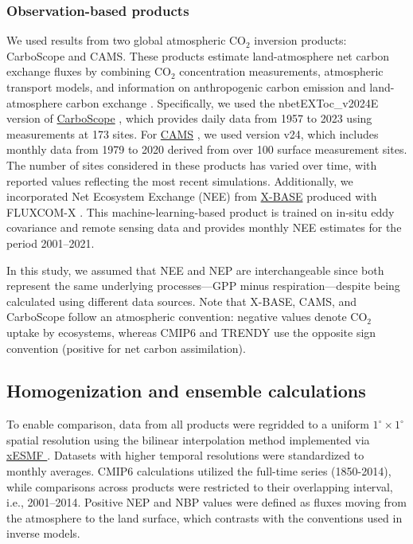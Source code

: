 \documentclass[9pt,twocolumn,twoside]{pnas-new}
\begin{document}
{%

\subsubsection*{Observation-based products}
We used results from two global atmospheric CO$_2$ inversion products: CarboScope and CAMS. These products estimate land-atmosphere net carbon exchange fluxes by combining CO$_2$ concentration measurements, atmospheric transport models, and information on anthropogenic carbon emission and land-atmosphere carbon exchange \citep{Kondo2022}. Specifically, we used the nbetEXToc\_v2024E version of \hyperlink{https://www.bgc-jena.mpg.de/CarboScope/?ID=nbetEXToc_v2024E}{CarboScope} \citep{Rodenbeck2005}, which provides daily data from 1957 to 2023 using measurements at 173 sites. For \hyperlink{https://ads.atmosphere.copernicus.eu/datasets/cams-global-greenhouse-gas-inversion?tab=overview}{CAMS} \citep{Chevallier2013}, we used version v24, which includes monthly data from 1979 to 2020 derived from over 100 surface measurement sites. The number of sites considered in these products has varied over time, with reported values reflecting the most recent simulations. Additionally, we incorporated Net Ecosystem Exchange (NEE) from \hyperlink{https://meta.icos-cp.eu/collections/zfwf1Ak2I7OlziGDTX8Xl6_T}{X-BASE} produced with FLUXCOM-X \citep{Nelson2024}. This machine-learning-based product is trained on in-situ eddy covariance and remote sensing data and provides monthly NEE estimates for the period 2001–2021.

In this study, we assumed that NEE and NEP are interchangeable since both represent the same underlying processes—GPP minus respiration—despite being calculated using different data sources. Note that X-BASE, CAMS, and CarboScope follow an atmospheric convention: negative values denote CO$_2$ uptake by ecosystems, whereas CMIP6 and TRENDY use the opposite sign convention (positive for net carbon assimilation).


\subsection*{Homogenization and ensemble calculations}
To enable comparison, data from all products were regridded to a uniform $1^\circ\times1^\circ$ spatial resolution using the bilinear interpolation method implemented via \hyperlink{https://xesmf.readthedocs.io/}{xESMF \citep{zhuang2023}}. Datasets with higher temporal resolutions were standardized to monthly averages. CMIP6 calculations utilized the full-time series (1850-2014), while comparisons across products were restricted to their overlapping interval, i.e., 2001–2014. Positive NEP and NBP values were defined as fluxes moving from the atmosphere to the land surface, which contrasts with the conventions used in inverse models.

}
\end{document}
